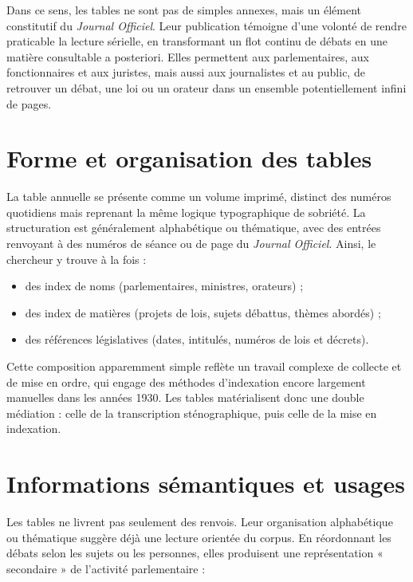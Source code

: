 Dans ce sens, les tables ne sont pas de simples annexes, mais un élément constitutif du \emph{Journal Officiel}. Leur publication témoigne d’une volonté de rendre praticable la lecture sérielle, en transformant un flot continu de débats en une matière consultable a posteriori. Elles permettent aux parlementaires, aux fonctionnaires et aux juristes, mais aussi aux journalistes et au public, de retrouver un débat, une loi ou un orateur dans un ensemble potentiellement infini de pages.

\section{Forme et organisation des tables}

La table annuelle se présente comme un volume imprimé, distinct des numéros quotidiens mais reprenant la même logique typographique de sobriété. La structuration est généralement alphabétique ou thématique, avec des entrées renvoyant à des numéros de séance ou de page du \emph{Journal Officiel}. Ainsi, le chercheur y trouve à la fois :

\begin{itemize}
\item des index de noms (parlementaires, ministres, orateurs) ;
\item des index de matières (projets de lois, sujets débattus, thèmes abordés) ;
\item des références législatives (dates, intitulés, numéros de lois et décrets).

\end{itemize}
Cette composition apparemment simple reflète un travail complexe de collecte et de mise en ordre, qui engage des méthodes d’indexation encore largement manuelles dans les années 1930. Les tables matérialisent donc une double médiation : celle de la transcription sténographique, puis celle de la mise en indexation.

\section{Informations sémantiques et usages}

Les tables ne livrent pas seulement des renvois. Leur organisation alphabétique ou thématique suggère déjà une lecture orientée du corpus. En réordonnant les débats selon les sujets ou les personnes, elles produisent une représentation « secondaire » de l’activité parlementaire :

